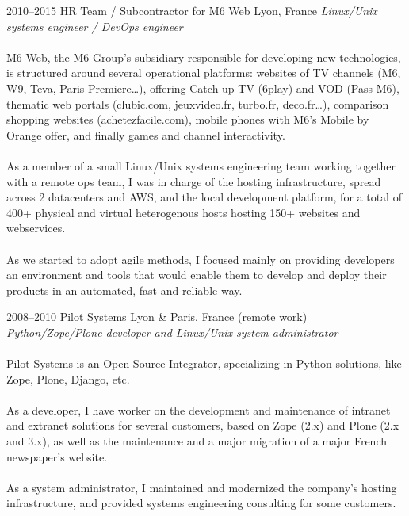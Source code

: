 \documentclass[]{friggeri-cv}
\begin{document}
\begin{entrylist}
  \entry
    {2010--2015}
    {HR Team / Subcontractor for M6 Web}
    {Lyon, France}
    {
      \textit{Linux/Unix systems engineer / DevOps engineer} \\
      \\
      M6 Web, the M6 Group’s subsidiary responsible for developing new
      technologies, is structured around several operational platforms:
      websites of TV channels (M6, W9, Teva, Paris Premiere\dots), offering
      Catch-up TV (6play) and VOD (Pass M6), thematic web portals (clubic.com,
      jeuxvideo.fr, turbo.fr, deco.fr\dots), comparison shopping websites
      (achetezfacile.com), mobile phones with M6’s Mobile by Orange offer, and
      finally games and channel interactivity. \\
      \\
      As a member of a small Linux/Unix systems engineering team working
      together with a remote ops team, I was in charge of the hosting
      infrastructure, spread across 2 datacenters and AWS, and the local
      development platform, for a total of 400+ physical and virtual
      heterogenous hosts hosting 150+ websites and webservices. \\
      \\
      As we started to adopt agile methods, I focused mainly on providing
      developers an environment and tools that would enable them to develop and
      deploy their products in an automated, fast and reliable way.
    }

  \entry
    {2008--2010}
    {Pilot Systems}
    {Lyon \& Paris, France (remote work)}
    {
        \textit{Python/Zope/Plone developer and Linux/Unix system
                administrator} \\
        \\
        Pilot Systems is an Open Source Integrator, specializing in Python
        solutions, like Zope, Plone, Django, etc. \\
        \\
        As a developer, I have worker on the development and maintenance of
        intranet and extranet solutions for several customers, based on Zope
        (2.x) and Plone (2.x and 3.x), as well as the maintenance and a major
        migration of a major French newspaper's website. \\
        \\
        As a system administrator, I maintained and modernized the company's
        hosting infrastructure, and provided systems engineering consulting for
        some customers.
    }


\end{entrylist}
\end{document}
